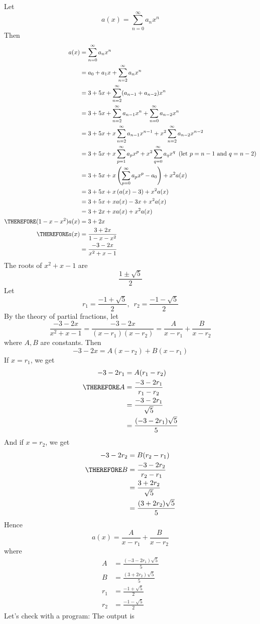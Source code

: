 Let
\[
a(x) = \sum_{n=0}^\infty a_n x^n
\]
Then
\begin{align*}
a(x)
&= \sum_{n=0}^\infty a_n x^n \\
&= a_0 + a_1x + \sum_{n=2}^\infty a_n x^n \\
&= 3 + 5x + \sum_{n=2}^\infty (a_{n-1} + a_{n-2}) x^n \\
&= 3 + 5x + \sum_{n=2}^\infty a_{n-1}x^n + \sum_{n=0}^\infty a_{n-2} x^n \\
&= 3 + 5x + x\sum_{n=2}^\infty a_{n-1}x^{n-1} + x^2\sum_{n=2}^\infty a_{n-2} x^{n-2} \\
&= 3 + 5x + x\sum_{p=1}^\infty a_{p}x^{p} + x^2\sum_{q=0}^\infty a_{q} x^{q}
\,\,\,\text{(let $p = n-1$ and $q=n-2$)}
\\
&= 3 + 5x + x\left( \sum_{p=0}^\infty a_{p}x^{p} - a_0 \right) + x^2a(x)
\\
&= 3 + 5x + x\left( a(x) - 3 \right) + x^2 a(x)
\\
&= 3 + 5x + x a(x) - 3x + x^2 a(x)
\\
&= 3 + 2x + x a(x) + x^2 a(x)
\\
\THEREFORE (1 - x - x^2) a(x)
&= 3 + 2x
\\
\THEREFORE  a(x)
&= \frac{3 + 2x}{1 - x - x^2}
\\
&= \frac{-3 - 2x}{x^2 + x -1}
\end{align*}
The roots of $x^2 + x -1$ are
\[
\frac{1 \pm \sqrt{5}}{2}
\]
Let
\[
r_1 = \frac{-1 + \sqrt{5}}{2}, \,\,\,
r_2 = \frac{-1 - \sqrt{5}}{2}
\]
By the theory of partial fractions, let
\[
\frac{-3 - 2x}{x^2 + x -1}
=
\frac{-3 - 2x}{(x - r_1)(x - r_2)}
=
\frac{A}{x - r_1} + \frac{B}{x - r_2}
\]
where $A,B$ are constants.
Then
\[
-3 - 2x
=
A(x - r_2) + B(x - r_1)
\]
If $x = r_1$, we get
\begin{align*}
-3 - 2r_1
&= A(r_1 - r_2)
\\
\THEREFORE
A
&= \frac{-3 - 2r_1}{r_1 - r_2} \\
&= \frac{-3 - 2r_1}{\sqrt{5}} \\
&= \frac{(-3 - 2r_1)\sqrt{5}}{5}
\end{align*}
And if $x = r_2$, we get
\begin{align*}
-3 - 2r_2
&= B(r_2 - r_1)
\\
\THEREFORE
B
&= \frac{-3 - 2r_2}{r_2 - r_1} \\
&= \frac{3 + 2r_2}{\sqrt{5}} \\
&= \frac{(3 + 2r_2)\sqrt{5}}{5}
\end{align*}
Hence
\[
a(x) = \frac{A}{x - r_1} + \frac{B}{x - r_2}
\]
where
\begin{align*}
A &= \frac{(-3 - 2r_1)\sqrt{5}}{5} \\
B &= \frac{(3 + 2r_2)\sqrt{5}}{5} \\
r_1 &= \frac{-1 + \sqrt{5}}{2} \\
r_2 &= \frac{-1 - \sqrt{5}}{2}
\end{align*}
Let's check with a program:
The output is

